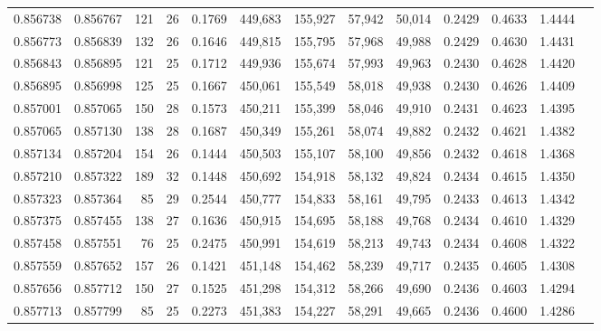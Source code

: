 \begin{tabular}{rrrrrrrrrrrrr}
0.856738 & 0.856767 &   121 &  26 &                                     0.1769 & 449,683 & 155,927 &  57,942 &  50,014 & 0.2429 & 0.4633 & 1.4444 \\
0.856773 & 0.856839 &   132 &  26 &                                     0.1646 & 449,815 & 155,795 &  57,968 &  49,988 & 0.2429 & 0.4630 & 1.4431 \\
0.856843 & 0.856895 &   121 &  25 &                                     0.1712 & 449,936 & 155,674 &  57,993 &  49,963 & 0.2430 & 0.4628 & 1.4420 \\
0.856895 & 0.856998 &   125 &  25 &                                     0.1667 & 450,061 & 155,549 &  58,018 &  49,938 & 0.2430 & 0.4626 & 1.4409 \\
0.857001 & 0.857065 &   150 &  28 &                                     0.1573 & 450,211 & 155,399 &  58,046 &  49,910 & 0.2431 & 0.4623 & 1.4395 \\
0.857065 & 0.857130 &   138 &  28 &                                     0.1687 & 450,349 & 155,261 &  58,074 &  49,882 & 0.2432 & 0.4621 & 1.4382 \\
0.857134 & 0.857204 &   154 &  26 &                                     0.1444 & 450,503 & 155,107 &  58,100 &  49,856 & 0.2432 & 0.4618 & 1.4368 \\
0.857210 & 0.857322 &   189 &  32 &                                     0.1448 & 450,692 & 154,918 &  58,132 &  49,824 & 0.2434 & 0.4615 & 1.4350 \\
0.857323 & 0.857364 &    85 &  29 &                                     0.2544 & 450,777 & 154,833 &  58,161 &  49,795 & 0.2433 & 0.4613 & 1.4342 \\
0.857375 & 0.857455 &   138 &  27 &                                     0.1636 & 450,915 & 154,695 &  58,188 &  49,768 & 0.2434 & 0.4610 & 1.4329 \\
0.857458 & 0.857551 &    76 &  25 &                                     0.2475 & 450,991 & 154,619 &  58,213 &  49,743 & 0.2434 & 0.4608 & 1.4322 \\
0.857559 & 0.857652 &   157 &  26 &                                     0.1421 & 451,148 & 154,462 &  58,239 &  49,717 & 0.2435 & 0.4605 & 1.4308 \\
0.857656 & 0.857712 &   150 &  27 &                                     0.1525 & 451,298 & 154,312 &  58,266 &  49,690 & 0.2436 & 0.4603 & 1.4294 \\
0.857713 & 0.857799 &    85 &  25 &                                     0.2273 & 451,383 & 154,227 &  58,291 &  49,665 & 0.2436 & 0.4600 & 1.4286 \\

\end{tabular}

